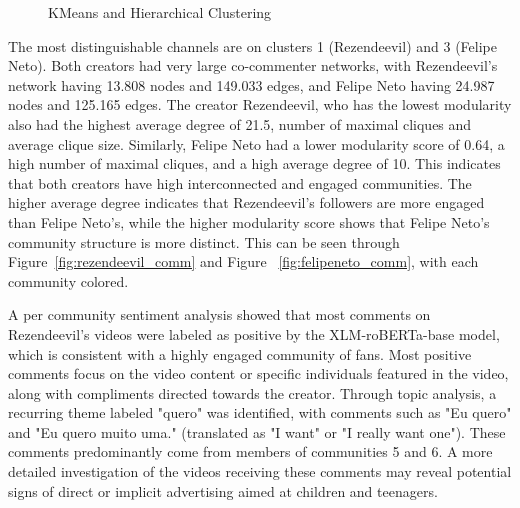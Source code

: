 \documentclass[12pt]{article}
\begin{document}
\begin{figure}[ht]
\begin{minipage}{0.45\textwidth}
    \end{minipage}
    \caption{KMeans and Hierarchical Clustering}
    \label{fig:kmeans_hierarchical}
\end{figure}


The most distinguishable channels are on clusters 1 (Rezendeevil) and 3 (Felipe Neto). 
Both creators had very large co-commenter networks, with Rezendeevil's network having 13.808 
nodes and 149.033 edges, and Felipe Neto having 24.987 nodes and 125.165 edges.
The creator Rezendeevil, who has the lowest modularity also had the highest 
average degree of 21.5, number of maximal cliques and average clique size.
Similarly, Felipe Neto had a lower modularity score of 0.64, a high number of maximal cliques,
and a high average degree of 10.
This indicates that both creators have high interconnected and engaged communities. The higher average
degree indicates that Rezendeevil's followers are more engaged than Felipe Neto's, while the higher
modularity score shows that Felipe Neto's community structure is more distinct.
This can be seen through Figure~\ref{fig:rezendeevil_comm} and Figure ~\ref{fig:felipeneto_comm}, 
with each community colored.

A per community sentiment analysis showed that most comments on Rezendeevil's videos were labeled as 
positive by the XLM-roBERTa-base model, which is consistent with a highly engaged community of fans.
Most positive comments focus on the video content or specific individuals featured in the video, 
along with compliments directed towards the creator. Through topic analysis, a recurring theme labeled 
"quero" was identified, with comments such as "Eu quero" and "Eu quero muito uma." 
(translated as "I want" or "I really want one").
These comments predominantly come from members of communities 5 and 6. A more detailed investigation 
of the videos receiving these comments may reveal potential signs of direct or implicit advertising 
aimed at children and teenagers.
\end{document}
